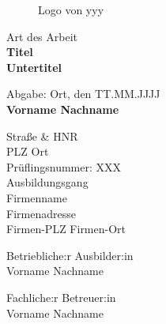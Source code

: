 \documentclass[10pt, ngerman, a4paper,toc=graduated, parskip=half, numbers=noenddot, headings=standardclasses, nonumberlist]{scrartcl}
\begin{document}
\hypersetup{pageanchor=false}
\thispagestyle{empty}

\vspace{1cm}

\begin{figure}[htbp]
    \centering

    \begin{minipage}[t]{0.45\textwidth}
        \raggedright
        
        \captionsetup{justification=raggedright,singlelinecheck=false}
        \caption{Logo von xxx \cite{citation_name}}
        \label{fig:abbildung_label}
    \end{minipage}
    \hfill
    \begin{minipage}[t]{0.45\textwidth}
        \raggedleft
        
        \captionsetup{justification=raggedleft,singlelinecheck=false}
        \caption{Logo von yyy \cite{citation_name}}
        \label{fig:abbildung2_label}
    \end{minipage}

\end{figure}

\vspace{1cm}
\begin{center}
	{\Large Art des Arbeit} \\
	\vspace{3cm}
	{\huge \textbf{Titel}}\\
    \vspace{0.3cm}
    {\LARGE \textbf{{Untertitel}}}\\
    
\end{center}

\vspace{1.5cm}
\begin{center}
	Abgabe: Ort, den TT.MM.JJJJ\\[4\baselineskip]
	\textbf{\textcolor{beispielfarbe}{Vorname Nachname}}

    Straße \& HNR \\
    PLZ Ort \\
    Prüflingsnummer: XXX \\
    Ausbildungsgang \\[4\baselineskip]

    Firmenname \\
    Firmenadresse \\
    Firmen-PLZ Firmen-Ort
	
	Betriebliche:r Ausbilder:in \\
    Vorname Nachname

    Fachliche:r Betreuer:in \\
    Vorname Nachname \\
\end{center}
\end{document}
